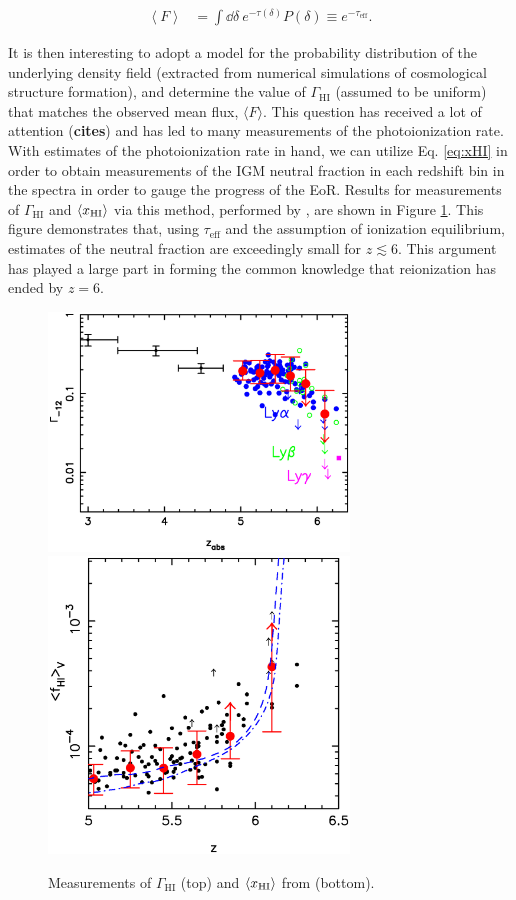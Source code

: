 \begin{align}
\left\langle F \right\rangle &= \int \dd \delta\ e^{-\tau(\delta)} P(\delta) \equiv e^{-\tau_{\text{eff}}}.
\end{align}


 It is then interesting to adopt a model for the probability distribution of the underlying density field (extracted from numerical simulations of cosmological structure formation), and determine the value of $\Gamma_{\text{HI}}$ (assumed to be uniform) that matches the observed mean flux, $\langle F \rangle$. This question has received a lot of attention ({\bf cites}) and has led to many measurements of the photoionization rate. With estimates of the photoionization rate in hand, we can utilize Eq. \ref{eq:xHI} in order to obtain measurements of the IGM neutral fraction in each redshift bin in the spectra in order to gauge the progress of the EoR. Results for measurements of $\Gamma_{\text{HI}}$ and $\langle x_{\text{HI}}\rangle$ via this method, performed by \citet{Fan2006a}, are shown in Figure \ref{fig:tauEffResults}. This figure demonstrates that, using $\tau_{\text{eff}}$ and the assumption of ionization equilibrium, estimates of the neutral fraction are exceedingly small for $z \lesssim 6$. This argument has played a large part in forming the common knowledge that reionization has ended by $z = 6$. 

\begin{figure}[!p]
  \centering
  \includegraphics[width=8cm]{Fan.gamma.eps}
  \includegraphics[width=8cm]{Fan.fHv.eps}
  \caption{Measurements of $\Gamma_{\text{HI}}$ (top) and $\langle x_{\text{HI}}\rangle$ from \citet{Fan2006a} (bottom).}
  \label{fig:tauEffResults}
\end{figure}


